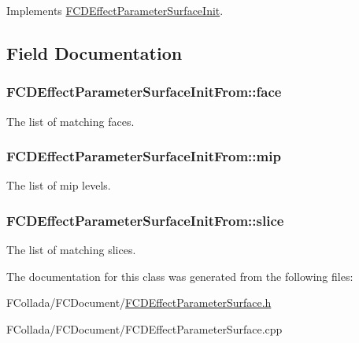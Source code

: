 Implements \hyperlink{classFCDEffectParameterSurfaceInit_ad0109233e63c892e5963a3ca67f7108f}{FCDEffectParameterSurfaceInit}.



\subsection{Field Documentation}
\hypertarget{classFCDEffectParameterSurfaceInitFrom_a78e6c19391ebf68c392be301db666ac8}{
\subsubsection[{face}]{ {\bf FCDEffectParameterSurfaceInitFrom::face}}}
\label{classFCDEffectParameterSurfaceInitFrom_a78e6c19391ebf68c392be301db666ac8}
The list of matching faces. \hypertarget{classFCDEffectParameterSurfaceInitFrom_ac7df5eff72c2fa2a183bacdfc3ac3799}{
\subsubsection[{mip}]{ {\bf FCDEffectParameterSurfaceInitFrom::mip}}}
\label{classFCDEffectParameterSurfaceInitFrom_ac7df5eff72c2fa2a183bacdfc3ac3799}
The list of mip levels. \hypertarget{classFCDEffectParameterSurfaceInitFrom_a9abea30f2ccd2f28a50d5678d22135cb}{
\subsubsection[{slice}]{ {\bf FCDEffectParameterSurfaceInitFrom::slice}}}
\label{classFCDEffectParameterSurfaceInitFrom_a9abea30f2ccd2f28a50d5678d22135cb}
The list of matching slices. 

The documentation for this class was generated from the following files:\begin{DoxyCompactItemize}
\item 
FCollada/FCDocument/\hyperlink{FCDEffectParameterSurface_8h}{FCDEffectParameterSurface.h}\item 
FCollada/FCDocument/FCDEffectParameterSurface.cpp\end{DoxyCompactItemize}
